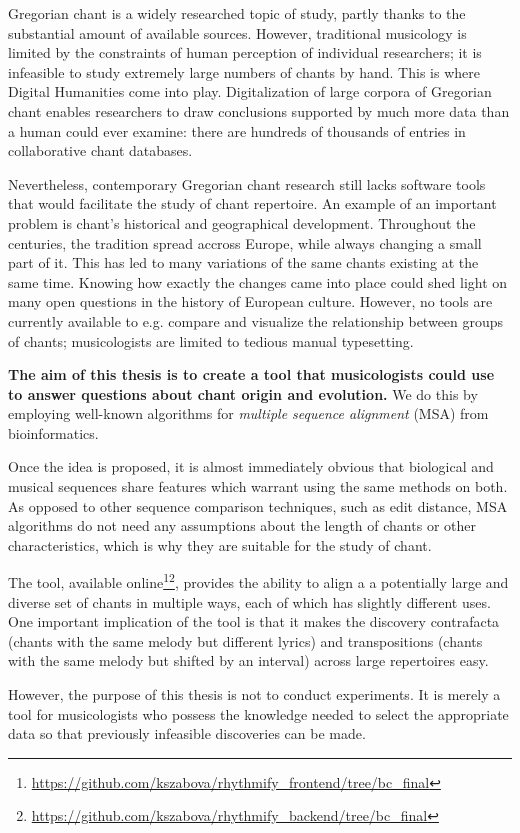 Gregorian chant is a widely researched topic of study, partly thanks to the substantial amount of available sources. However, traditional
musicology is limited by the constraints of human perception of individual researchers; it is infeasible to study extremely large numbers of chants by hand. This is where
Digital Humanities come into play. Digitalization of large corpora of Gregorian chant enables researchers to draw conclusions
supported by much more data than a human could ever examine: there are hundreds of thousands of entries in collaborative chant databases.

Nevertheless, contemporary Gregorian chant research still lacks software tools that would facilitate the study of chant repertoire. An example
of an important problem is chant's historical and geographical development. Throughout the 
centuries, the tradition spread accross Europe, while always changing a small part of it. This has led to many variations of the same
chants existing at the same time. Knowing how exactly the changes came into place could shed light on many open questions in the history of 
European culture. However, no tools are currently available to e.g. compare and visualize the relationship between groups of chants; musicologists
are limited to tedious manual typesetting.

\textbf{The aim of this thesis is to create a tool that musicologists could use to answer questions about chant origin and evolution.} We do this by employing
well-known algorithms for \emph{multiple sequence alignment} (MSA) from bioinformatics.

Once the idea is proposed, it is almost immediately obvious that
biological and musical sequences share features which warrant using the same methods on both. As opposed to other sequence comparison techniques, such as edit
distance, MSA algorithms do not need any assumptions about the length of chants or other characteristics, which is why they are suitable
for the study of chant.

The tool, available online\footnote{\url{https://github.com/kszabova/rhythmify_frontend/tree/bc_final}}\footnote{\url{https://github.com/kszabova/rhythmify_backend/tree/bc_final}},
provides the ability to align a a potentially large and diverse set of chants in multiple ways, each of which has slightly different uses. One important
implication of the tool is that it makes the discovery contrafacta (chants with the same melody but different lyrics) and transpositions
(chants with the same melody but shifted by an interval) across large repertoires easy.

However, the purpose of this thesis is not to conduct experiments. It is merely a tool for musicologists who possess
the knowledge needed to select the appropriate data so that previously infeasible discoveries can be made.

